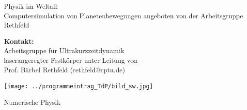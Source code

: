 \documentclass[
  a0paper,
  portrait,
  fontscale=.35 %
  ]{baposterrptu}
\begin{document}
\begin{poster}{
  }
  {}%
  {Physik im Weltall: \\ \sf Computersimulation von Planetenbewegungen}
  {angeboten von der Arbeitsgruppe Rethfeld}
  {\rptuLogo}
  {
    \begin{minipage}{.8\footerheight}
    \end{minipage}
    \hfill
    \begin{minipage}{.35\paperwidth}
      \textbf{Kontakt:}\\
      Arbeitsgruppe für Ultrakurzzeitdynamik \\laserangeregter Festkörper
      unter Leitung von \\Prof. Bärbel Rethfeld (rethfeld@rptu.de)
    \end{minipage}
  }
  {
    \begin{center}
    \texttt{[image: ../programmeintrag\_TdP/bild\_sw.jpg]}
    \end{center}
  }
  \begin{posterbox}[name=intro,column=0,row=0]{Numerische Physik}


\end{posterbox}
\end{poster}
\end{document}
